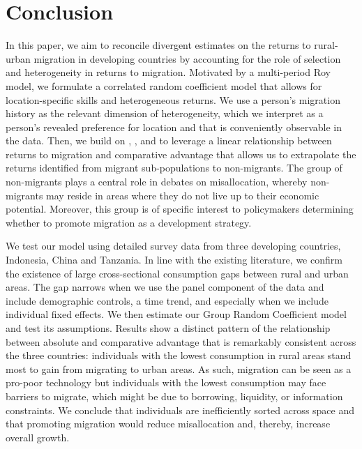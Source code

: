 \section{Conclusion}\label{sec:conclusion}

In this paper, we aim to reconcile divergent estimates on the returns to rural-urban migration in developing countries by accounting for the role of selection and heterogeneity in returns to migration. Motivated by a multi-period Roy model, we formulate a correlated random coefficient model that allows for location-specific skills and heterogeneous returns.  
We use a person’s migration history as the relevant dimension of heterogeneity, which we interpret as a person’s revealed preference for location and that is conveniently observable in the data. 
Then, we build on \cite{suriSelectionComparativeAdvantage2011}, 
\cite{lemieuxEstimatingEffectsUnions1998}, and   \cite{tjernstromCommentSuri2011} to leverage a linear relationship between returns to migration and comparative advantage that allows us to extrapolate the returns identified from migrant sub-populations to non-migrants.
The group of non-migrants plays a central role in debates on misallocation, whereby non-migrants may reside in areas where they do not live up to their economic potential. 
Moreover, this group is of specific interest to policymakers determining whether to promote migration as a development strategy.

We test our model using detailed survey data from three developing countries, Indonesia, China and Tanzania. In line with the existing literature, we confirm the existence of large cross-sectional consumption gaps between rural and urban areas. The gap narrows when we use the panel component of the data and include demographic controls, a time trend, and especially when we include individual fixed effects. 
We then estimate our Group Random Coefficient model and test its assumptions. 
Results show a distinct pattern of the relationship between absolute and comparative advantage that is remarkably consistent across the three countries: individuals with the lowest consumption in rural areas stand most to gain from migrating to urban areas. 
As such, migration can be seen as a pro-poor technology but individuals with the lowest consumption may face barriers to migrate, which might be due to borrowing, liquidity, or information constraints. 
We conclude that individuals are inefficiently sorted across space and that promoting migration would reduce misallocation and, thereby, increase overall growth. 



